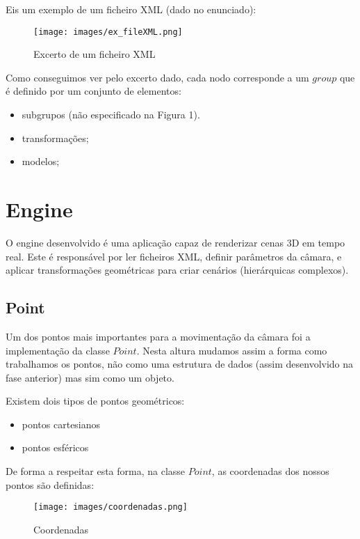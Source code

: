 \documentclass{article}
\begin{document}
Eis um exemplo de um ficheiro XML (dado no enunciado):

\begin{figure}[h]
    \centering
    \texttt{[image: images/ex\_fileXML.png]}
    \caption{Excerto de um ficheiro XML}
    \label{fig:exemplo}
\end{figure}

Como conseguimos ver pelo excerto dado, cada nodo corresponde a um $group$ que é definido por um conjunto de elementos:
\begin{itemize}
    \item subgrupos (não especificado na Figura 1).
    \item transformações;
    \item modelos;
\end{itemize}

\newpage

\section{Engine}

O engine desenvolvido é uma aplicação capaz de renderizar cenas 3D em tempo real. Este é responsável por ler ficheiros XML, definir parâmetros da câmara, e aplicar transformações geométricas para criar cenários (hierárquicas complexos).

\subsection{Point}
Um dos pontos mais importantes para a movimentação da câmara foi a implementação da classe $Point$.
Nesta altura mudamos assim a forma como trabalhamos os pontos, não como uma estrutura de dados (assim desenvolvido na fase anterior) mas sim como um objeto.

Existem dois tipos de pontos geométricos: 
\begin{itemize}
    \item pontos cartesianos
    \item pontos esféricos
\end{itemize}

De forma a respeitar esta forma, na classe $Point$, as coordenadas dos nossos pontos são definidas:

\begin{figure}[h]
    \centering
    \texttt{[image: images/coordenadas.png]}
    \caption{Coordenadas}
    \label{fig:exemplo}
\end{figure}
\end{document}
